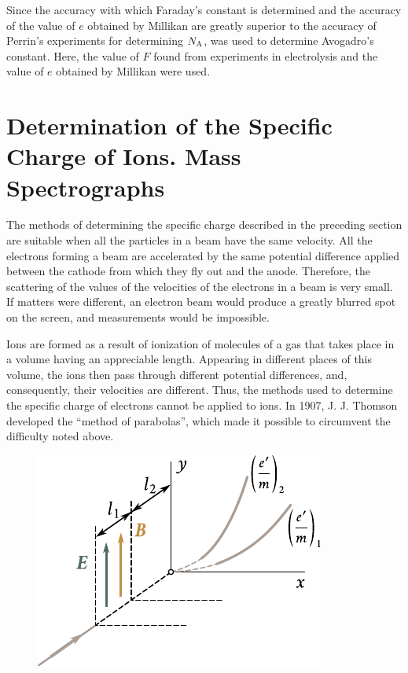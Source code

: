 Since the accuracy with which Faraday's constant is determined and the accuracy of the value of $e$ obtained by Millikan are greatly superior to the accuracy of Perrin's experiments for determining $N_{\text{A}}$,  was used to determine Avogadro's constant.
Here, the value of $F$ found from experiments in electrolysis and the value of $e$ obtained by Millikan were used.

\section{Determination of the Specific Charge of Ions. Mass Spectrographs}\label{sec:10_4}

The methods of determining the specific charge described in the preceding section are suitable when all the particles in a beam have the same velocity.
All the electrons forming a beam are accelerated by the same potential difference applied between the cathode from which they fly out and the anode.
Therefore, the scattering of the values of the velocities of the electrons in a beam is very small.
If matters were different, an electron beam would produce a greatly blurred spot on the screen, and measurements would be impossible.

Ions are formed as a result of ionization of molecules of a gas that takes place in a volume having an appreciable length.
Appearing in different places of this volume, the
ions then pass through different potential differences, and, consequently, their velocities are different.
Thus, the methods used to determine the specific charge of electrons cannot be applied to ions.
In 1907, J. J. Thomson developed the ``method of parabolas'', which made it possible to circumvent the
difficulty noted above.

\begin{figure}[t]
	\begin{center}
		\includegraphics[scale=1]{figures/ch_10/fig_10_9.pdf}
		\caption[]{}
		\label{fig:10_9}
	\end{center}
	\vspace{-0.8cm}
\end{figure}

